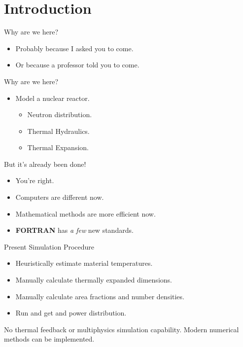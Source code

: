 \section{Introduction}
\label{sec:introduction}

\begin{frame}{Why are we here?}
  \pause
  \begin{itemize}
    \item Probably because I asked you to come.
    \item Or because a professor told you to come.
  \end{itemize}
\end{frame}

\begin{frame}{Why are we here?}
  \begin{itemize}
    \item {\huge Model a nuclear reactor.}
      \pause
      \begin{itemize}
        \item Neutron distribution.
        \item Thermal Hydraulics.
        \item Thermal Expansion.
      \end{itemize}
  \end{itemize}
\end{frame}

\begin{frame}{But it's already been done!}
  \begin{itemize}
    \pause 
    \item You're right.
    \pause
    \item Computers are different now.
    \item Mathematical methods are more efficient now.
    \item \textbf{FORTRAN} has \textit{a few} new standards.
  \end{itemize}
\end{frame}

\begin{frame}{Present Simulation Procedure}
  \begin{itemize}
    \item Heuristically estimate material temperatures.
    \item Manually calculate thermally expanded dimensions.
    \item Manually calculate area fractions and number densities.
    \item Run \dif and get \keff and power distribution.
    \pause
  \end{itemize}
  \vspace{0.3in}
  \begin{block}{}
    No thermal feedback or multiphysics simulation capability. Modern numerical 
    methods can be implemented.
  \end{block}
\end{frame}

